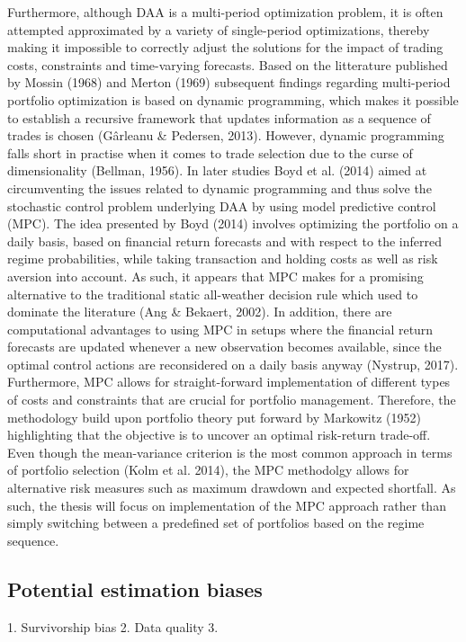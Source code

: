 Furthermore, although DAA is a multi-period optimization problem, it is often attempted approximated by a variety of single-period optimizations, thereby making it impossible to correctly adjust the solutions for the impact of trading costs, constraints and time-varying forecasts. Based on the litterature published by Mossin (1968) and Merton (1969) subsequent findings regarding multi-period portfolio optimization is based on dynamic programming, which makes it possible to establish a recursive framework that updates information as a sequence of trades is chosen (Gârleanu \& Pedersen, 2013). However, dynamic programming falls short in practise when it comes to trade selection due to the curse of dimensionality (Bellman, 1956). In later studies Boyd et al. (2014) aimed at circumventing the issues related to dynamic programming and thus solve the stochastic control problem underlying DAA by using model predictive control (MPC). The idea presented by Boyd (2014) involves optimizing the portfolio on a daily basis, based on financial return forecasts and with respect to the inferred regime probabilities, while taking transaction and holding costs as well as risk aversion into account. As such, it appears that MPC makes for a promising alternative to the traditional static all-weather decision rule which used to dominate the literature (Ang \& Bekaert, 2002). In addition, there are computational advantages to using MPC in setups where the financial return forecasts are updated whenever a new observation becomes available, since the optimal
control actions are reconsidered on a daily basis anyway (Nystrup, 2017). Furthermore, MPC allows for straight-forward implementation of different types of costs and constraints that are crucial for portfolio management. Therefore, the methodology build upon portfolio theory put forward by Markowitz (1952) highlighting that the objective is to uncover an optimal risk-return trade-off. Even though the mean-variance criterion is the most common approach in terms of portfolio selection (Kolm et al. 2014), the MPC methodolgy allows for alternative risk measures such as maximum drawdown and expected shortfall. As such, the thesis will focus on implementation of the MPC approach rather than simply switching between a predefined set of portfolios based on the regime sequence.  



\subsection{Potential estimation biases}
1. Survivorship bias
2. Data quality
3. 

